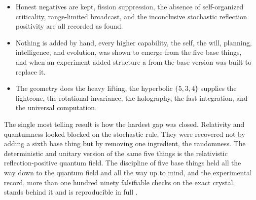 \begin{itemize}
\item Honest negatives are kept, fission suppression, the absence of
self-organized criticality, range-limited broadcast, and the inconclusive stochastic reflection positivity are
all recorded as found.
\item Nothing is added by hand, every higher capability, the self, the will, planning,
intelligence, and evolution, was shown to emerge from the five base things, and when an experiment added
structure a from-the-base version was built to replace it.
\item The geometry does the heavy lifting, the
hyperbolic $\{5,3,4\}$ supplies the lightcone, the rotational invariance, the holography, the fast
integration, and the universal computation.
\end{itemize}

The single most telling result is how the hardest gap was closed. Relativity and quantumness looked blocked on
the stochastic rule. They were recovered not by adding a sixth base thing but by removing one ingredient, the
randomness. The deterministic and unitary version of the same five things is the relativistic
reflection-positive quantum field. The discipline of five base things held all the way down to the quantum
field and all the way up to mind, and the experimental record, more than one hundred ninety falsifiable checks
on the exact crystal, stands behind it and is reproducible in full \cite{pollard2026vibetest}.

